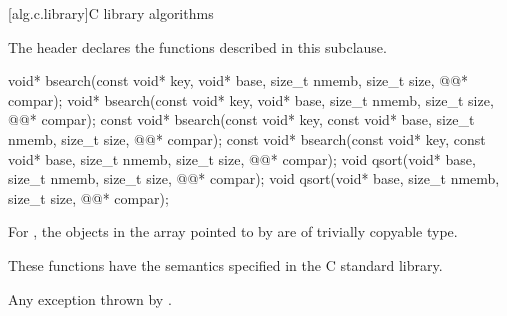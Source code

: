 [alg.c.library]{C library algorithms}

\pnum
\begin{note}
The header 
declares the functions described in this subclause.
\end{note}

%
%
\begin{itemdecl}
void* bsearch(const void* key, void* base, size_t nmemb, size_t size,
              @@* compar);
void* bsearch(const void* key, void* base, size_t nmemb, size_t size,
              @@* compar);
const void* bsearch(const void* key, const void* base, size_t nmemb, size_t size,
                    @@* compar);
const void* bsearch(const void* key, const void* base, size_t nmemb, size_t size,
                    @@* compar);
void qsort(void* base, size_t nmemb, size_t size, @@* compar);
void qsort(void* base, size_t nmemb, size_t size, @@* compar);
\end{itemdecl}

\begin{itemdescr}
\pnum
\expects
For , the objects in the array pointed to by 
are of trivially copyable type.

\pnum
\effects
These functions have the semantics specified in the C standard library.

\pnum
\throws
Any exception thrown by .
\end{itemdescr}


